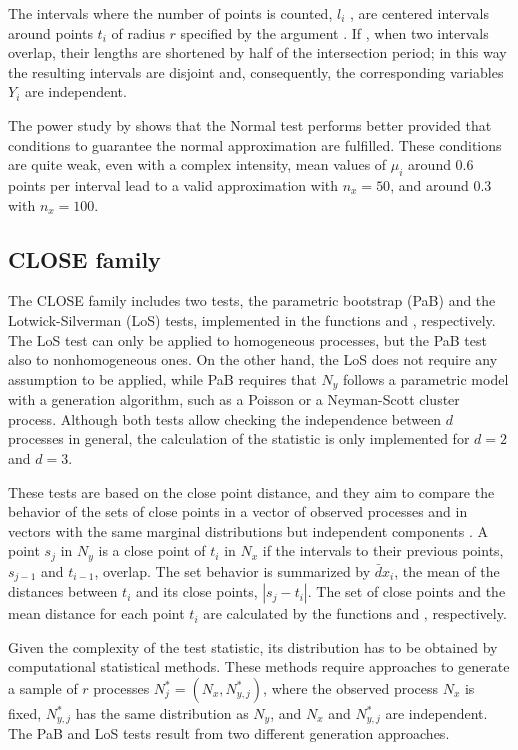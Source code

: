 The intervals  where the number of points is counted, $l_i$ , are centered intervals around  points $t_i$ of radius $r$ specified  by the  argument . If 
 ,  when two  intervals overlap, their lengths are  shortened by half of the intersection period; in this way  the  resulting intervals are disjoint and, consequently,  the corresponding variables $Y_i$  are independent.

The power study  by \citet{Cebrian20} shows that the  Normal test  performs better provided that conditions to guarantee the normal approximation are fulfilled.  These conditions are quite weak,  even  with  a complex intensity,  mean values  of $\mu_i$ around 0.6  points per interval lead to a valid approximation with $n_x=50$, and around  0.3 with $n_x=100$.



\subsection{CLOSE family}
\label{CLOSEtests}


The CLOSE family includes two tests,  the parametric bootstrap (PaB) and the Lotwick-Silverman (LoS) tests,  implemented in the  functions   and , respectively. The  LoS test can only  be applied  to  homogeneous processes, but  the PaB  test also to  nonhomogeneous ones. On the other hand, the LoS does not require any assumption to be applied, while PaB requires that $N_y$ follows a parametric model  with a generation algorithm, such as a Poisson or a Neyman-Scott cluster process.	
Although both tests allow  checking the independence between $d$ processes in general, the  calculation of the statistic is only implemented for $d=2$ and $d=3$.


These tests  are based on the  close point  distance, and they aim to compare the behavior  of the  sets of close points in a vector of observed  processes and in  vectors with the  same  marginal distributions but  independent components \citep{Abaurrea15}.
A point $s_j$  in $N_y$ is a close point of $t_i$ in $N_x$ if the intervals to their previous points, $s_{j-1}$ and $t_{i-1}$, overlap. The set behavior is summarized by $\bar dx_i$, the mean of  the distances between $t_i$ and  its close points, $|s_j-t_i|$.  The set of close points and the mean distance for each point $t_i$ are calculated by the functions  and , respectively.  


Given the complexity of the test statistic, its distribution  has to be obtained by computational statistical methods. These methods  require approaches  to generate a sample of $r$ processes $N^*_j=(N_{x}, N^*_{y,j})$, where  the observed process $N_x$  is fixed,   $N^*_{y,j}$   has the same  distribution as $N_y$,  and $N_x$ and $N^*_{y,j}$ are independent. The PaB and LoS tests result from two  different generation approaches.


